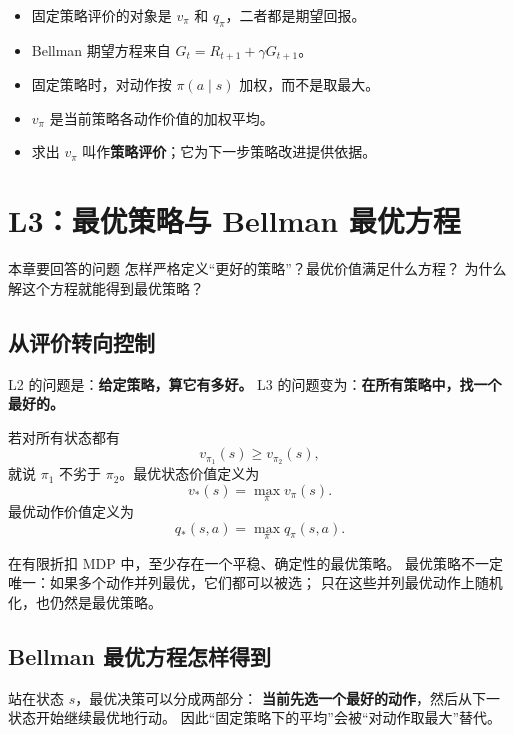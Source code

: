 \documentclass[11pt,a4paper,fontset=fandol]{ctexart}
\newcommand{\vpi}{v_{\pi}}
\newcommand{\qpi}{q_{\pi}}
\newcommand{\vstar}{v_*}
\newcommand{\qstar}{q_*}
\begin{document}
\begin{memorybox}
\begin{itemize}
  \item 固定策略评价的对象是 \(\vpi\) 和 \(\qpi\)，二者都是期望回报。
  \item Bellman 期望方程来自 \(G_t=R_{t+1}+\gamma G_{t+1}\)。
  \item 固定策略时，对动作按 \(\pi(a\mid s)\) 加权，而不是取最大。
  \item \(\vpi\) 是当前策略各动作价值的加权平均。
  \item 求出 \(\vpi\) 叫作\textbf{策略评价}；它为下一步策略改进提供依据。
\end{itemize}
\end{memorybox}

\clearpage
\section{L3：最优策略与 Bellman 最优方程}

\begin{goalbox}{本章要回答的问题}
怎样严格定义“更好的策略”？最优价值满足什么方程？
为什么解这个方程就能得到最优策略？
\end{goalbox}

\subsection{从评价转向控制}

L2 的问题是：\textbf{给定策略，算它有多好。}
L3 的问题变为：\textbf{在所有策略中，找一个最好的。}

若对所有状态都有
\[
v_{\pi_1}(s)\geq v_{\pi_2}(s),
\]
就说 \(\pi_1\) 不劣于 \(\pi_2\)。最优状态价值定义为
\[
\boxed{
\vstar(s)=\max_\pi v_\pi(s)
}.
\]
最优动作价值定义为
\[
\boxed{
\qstar(s,a)=\max_\pi q_\pi(s,a)
}.
\]

在有限折扣 MDP 中，至少存在一个平稳、确定性的最优策略。
最优策略不一定唯一：如果多个动作并列最优，它们都可以被选；
只在这些并列最优动作上随机化，也仍然是最优策略。

\subsection{Bellman 最优方程怎样得到}

\begin{intuitionbox}
站在状态 \(s\)，最优决策可以分成两部分：
\textbf{当前先选一个最好的动作}，然后从下一状态开始继续最优地行动。
因此“固定策略下的平均”会被“对动作取最大”替代。
\end{intuitionbox}
\end{document}
